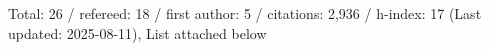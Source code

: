 Total: 26 / refereed: 18 / first author: 5 / citations: 2,936 / h-index: 17 (Last updated: 2025-08-11), List attached below